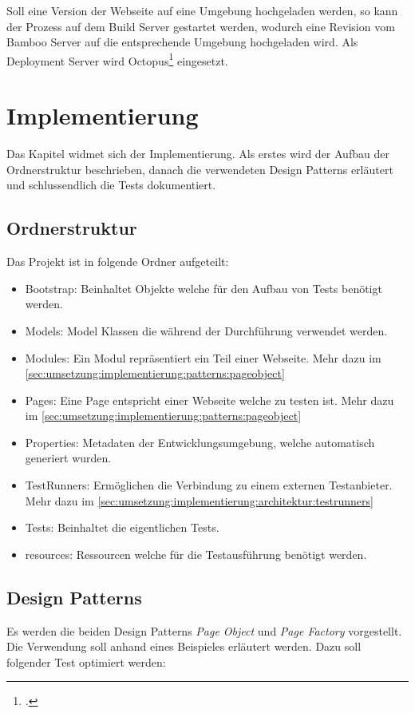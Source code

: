 Soll eine Version der Webseite auf eine Umgebung hochgeladen werden, so kann der Prozess auf dem Build Server gestartet werden, wodurch eine Revision vom Bamboo Server auf die entsprechende Umgebung hochgeladen wird. Als Deployment Server wird Octopus\footcite{Octopus_Deploy_2015-09-28} eingesetzt.

\section{Implementierung}
\label{sec:umsetzung:implementierung}
Das Kapitel widmet sich der Implementierung. Als erstes wird der Aufbau der Ordnerstruktur beschrieben, danach die verwendeten Design Patterns erläutert und schlussendlich die Tests dokumentiert.

\subsection{Ordnerstruktur}
Das Projekt ist in folgende Ordner aufgeteilt:
\begin{itemize}
\item Bootstrap: Beinhaltet Objekte welche für den Aufbau von Tests benötigt werden.
\item Models: Model Klassen die während der Durchführung verwendet werden.
\item Modules: Ein Modul repräsentiert ein Teil einer Webseite. Mehr dazu im \cref{sec:umsetzung:implementierung:patterns:pageobject} 
\item Pages: Eine Page entspricht einer Webseite welche zu testen ist. Mehr dazu im \cref{sec:umsetzung:implementierung:patterns:pageobject} 
\item Properties: Metadaten der Entwicklungsumgebung, welche automatisch generiert wurden.
\item TestRunners: Ermöglichen die Verbindung zu einem externen Testanbieter. Mehr dazu im \cref{sec:umsetzung:implementierung:architektur:testrunners} 
\item Tests: Beinhaltet die eigentlichen Tests.
\item resources: Ressourcen welche für die Testausführung benötigt werden.
\end{itemize}

\subsection{Design Patterns}
Es werden die beiden Design Patterns \textit{Page Object} und \textit{Page Factory} vorgestellt. Die Verwendung soll anhand eines Beispieles erläutert werden. Dazu soll folgender Test optimiert werden:

